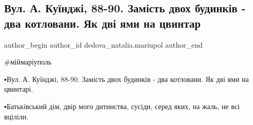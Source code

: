  
 
 
 
 

\subsection{Вул. А. Куїнджі, 88-90. Замість двох будинків - два котловани. Як дві ями на цвинтар}
\label{sec:06_02_2023.fb.dedova_natalia.mariupol.1.vul__a__ku_ndzh___88}

\ifcmt
 author_begin
   author_id dedova_natalia.mariupol
 author_end
\fi

\#міймаріуполь

▪️Вул. А. Куїнджі, 88-90. Замість двох будинків - два котловани. Як дві ями на цвинтарі. 

▪️Батьківський дім, двір мого дитинства, сусіди, серед яких, на жаль, не всі вціліли. 🥀

